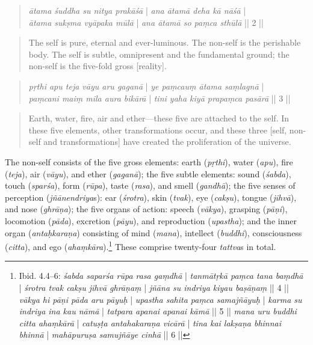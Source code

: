 \begin{quote}
\textit{ātama śuddha su nitya prakāśā} | \textit{ana ātamā deha kā nāśā} |\\
\textit{ātama sukṣma vyāpaka mūlā} | \textit{ana ātamā so paṃca sthūlā} || 2 || 
\end{quote}\begin{quote}
The self is pure, eternal and ever-luminous. The non-self is the perishable body. The self is subtle, omnipresent and the fundamental ground; the non-self is the five-fold gross [reality].
\end{quote}\begin{quote}
\textit{pṛthi apu teja vāyu aru gaganā} | \textit{ye paṃcauṃ ātama saṃlagnā} |\\
\textit{paṃcani maiṃ mila aura bikārā} | \textit{tini yaha kiyā prapaṃca pasārā} || 3 ||
\end{quote}\begin{quote}
Earth, water, fire, air and ether---these five are attached to the self. In these five elements, other transformations occur, and these three [self, non-self and transformations] have created the proliferation of the universe.
\end{quote}

The non-self consists of the five gross elements: earth (\textit{pṛthi}), water (\textit{apu}), fire (\textit{teja}), air (\textit{vāyu}), and ether (\textit{gaganā}); the five subtle elements: sound (\textit{śabda}), touch (\textit{sparśa}), form (\textit{rūpa}), taste (\textit{rasa}), and smell (\textit{gandhā}); the five senses of perception (\textit{jñānendriya}s): ear (\textit{śrotra}), skin (\textit{tvak}), eye (\textit{cakṣu}), tongue (\textit{jihvā}), and nose (\textit{ghrāṇa}); the five organs of action: speech (\textit{vākya}), grasping (\textit{pāṇi}), locomotion (\textit{pāda}), excretion (\textit{pāyu}), and reproduction (\textit{upastha}); and the inner organ (\textit{antaḥkaraṇa}) consisting of mind (\textit{mana}), intellect (\textit{buddhi}), consciousness (\textit{citta}), and ego (\textit{ahaṃkāra}).\footnote{Ibid. 4.4–6: \textit{śabda saparśa rūpa rasa gaṃdhā} | \textit{tanmātṛkā paṃca tana baṃdhā} | \textit{śrotra tvak cakṣu jihvā ghrāṇaṃ} | \textit{jñāna su indriya kiyau baṣāṇaṃ} || 4 || \textit{vākya hi pāṇi pāda aru pāyuḥ} | \textit{upastha sahita paṃca samajñāyuḥ} | \textit{karma su indriya ina kau nāmā} | \textit{tatpara apanai apanai kāmā} || 5 || \textit{mana uru buddhi citta ahaṃkārā} | \textit{catuṣṭa antahakaraṇa vicārā} | \textit{tina kai lakṣaṇa bhinnai bhinnā} | \textit{mahāpuruṣa samujñāye cinhā} || 6 ||} These comprise twenty-four \textit{tattva}s in total.

